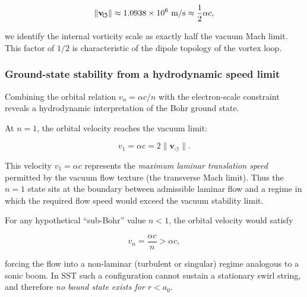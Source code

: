 \documentclass[10pt,reprint,aps,onecolumn,nofootinbib]{revtex4-2}
\begin{document}
            \begin{equation}
                \lVert \mathbf{v}_{\!\boldsymbol{\circlearrowleft}}\rVert
                \approx 1.0938\times 10^{6}~{\rm m/s}
                \approx \frac{1}{2}\alpha c,
            \end{equation}

            we identify the internal vorticity scale as exactly half the vacuum Mach
            limit. This factor of $1/2$ is characteristic of the dipole topology
            of the vortex loop.

        \subsubsection*{Ground-state stability from a hydrodynamic speed limit}

            Combining the orbital relation $v_n = \alpha c / n$ with the
            electron-scale constraint reveals a hydrodynamic interpretation of the
            Bohr ground state.

            At $n=1$, the orbital velocity reaches the vacuum limit:

            \begin{equation}
                v_1 = \alpha c = 2 \lVert \mathbf{v}_{\!\boldsymbol{\circlearrowleft}}\rVert.
            \end{equation}

            This velocity $v_1 = \alpha c$ represents the \emph{maximum laminar
    translation speed} permitted by the vacuum flow texture (the transverse
            Mach limit). Thus the $n=1$ state sits at the boundary between
            admissible laminar flow and a regime in which the required flow speed
            would exceed the vacuum stability limit.

            For any hypothetical ``sub-Bohr'' value $n<1$, the orbital velocity
            would satisfy

            \begin{equation}
                v_n = \frac{\alpha c}{n} > \alpha c,
            \end{equation}

            forcing the flow into a non-laminar (turbulent or singular) regime
            analogous to a sonic boom. In SST such a configuration cannot sustain
            a stationary swirl string, and therefore \emph{no bound state exists
    for $r < a_0$}.
\end{document}
